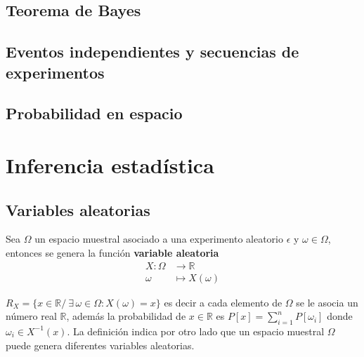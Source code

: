 \documentclass[10pt,]{krantz}
\theoremstyle{definition}
\theoremstyle{definition}
\theoremstyle{definition}
\theoremstyle{remark}
\let\BeginKnitrBlock\begin \let\EndKnitrBlock\end
\begin{document}
\hypertarget{teorema-de-bayes}{%
\chapter{Teorema de Bayes}\label{teorema-de-bayes}}

\hypertarget{eventos-independientes-y-secuencias-de-experimentos}{%
\chapter{Eventos independientes y secuencias de experimentos}\label{eventos-independientes-y-secuencias-de-experimentos}}

\hypertarget{probabilidad-en-espacio}{%
\chapter{Probabilidad en espacio}\label{probabilidad-en-espacio}}

\hypertarget{part-inferencia-estaduxedstica}{%
\part{Inferencia estadística}\label{part-inferencia-estaduxedstica}}

\hypertarget{variables-aleatorias}{%
\chapter{Variables aleatorias}\label{variables-aleatorias}}

\BeginKnitrBlock{definition}[Variable aleatoria]
\protect\hypertarget{def:unnamed-chunk-9}{}{\label{def:unnamed-chunk-9} \iffalse (Variable aleatoria) \fi{} }Sea \(\Omega\) un espacio muestral asociado a una experimento aleatorio \(\epsilon\) y \(\omega\in\Omega\), entonces se genera la función \textbf{variable aleatoria}
\begin{align*}
  X:\Omega&\longrightarrow \mathbb{R}\\
  \omega&\longmapsto X(\omega)
\end{align*}
\EndKnitrBlock{definition}

\(R_{X}=\{x\in \mathbb {R} /\ \exists \,\omega \in \Omega :X(\omega )=x\}\)
es decir a cada elemento de \(\Omega\) se le asocia un número real \(\mathbb{R}\), además la probabilidad de \(x\in \mathbb{R}\) es \(P[x]= \sum^{n}_{i=1}P\left[\omega_i\right]\) donde \(\omega_i\in X^{-1}(x)\). La definición indica por otro lado que un espacio muestral \(\Omega\) puede genera diferentes variables aleatorias.
\end{document}
